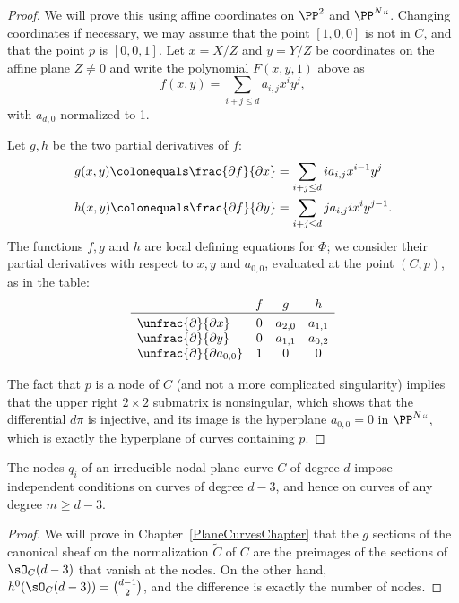 \begin{proof}
We will prove this using affine coordinates on $\PP^2$ and $\PP^N` `$.
Changing coordinates if necessary, we may assume that the point
$[1,0,0]$ is not in $C$, and that the point $p$ is $[0,0,1]$.
Let $x = X/Z$ and $y = Y/Z$ be coordinates on the affine plane $Z \neq 0$ and
write the polynomial $F(x,y,1)$ above as
$$
f(x,y) = \sum_{i+j \leq d} a_{i,j} x^iy^j
,
$$
with $a_{d,0}$ normalized to 1.

Let $g,h$ be the two partial derivatives of $f$:
\begin{align*}
 g(x,y) \colonequals  \frac{\partial f}{\partial x} &= \sum_{i+j \leq d} i a_{i,j} x^{i-1}y^j\\
h(x,y) \colonequals  \frac{\partial f}{\partial y} &= \sum_{i+j \leq d} j a_{i,j} ix^{i}y^{j-1}.
\end{align*}
The functions $f, g$ and $h$ are local defining equations for $\Phi$;
we consider their partial derivatives with respect to $x, y$ and
$a_{0,0}$, evaluated at the point $(C,p)$, as in
the table:
$$
     \begin{array}{lccc} %
            & f & g & h \\
      \hline
\vbox to 11pt{} %
\unfrac{\partial}{\partial x} & 0 & a_{2,0} & a_{1,1} \\
\unfrac{\partial}{\partial y} & 0 & a_{1,1} & a_{0,2} \\
\unfrac{\partial}{\partial a_{0,0}} & 1 & 0 & 0
    \end{array}
$$

The fact that $p$ is a node of $C$ (and not a more complicated singularity) implies that the upper right $2 \times 2$ submatrix is nonsingular, which shows that the differential $d\pi$ is injective, and its image is the hyperplane $a_{0,0} = 0$ in $\PP^N` `$, which is exactly the hyperplane of curves containing $p$.
\end{proof}

\begin{lemma}\label{adjoint independent}
The nodes $q_i$ of an irreducible nodal plane curve $C$ of degree $d$
%
%
impose independent conditions on curves of degree $d-3$, and hence on
curves of any degree $m \geq d-3$.
\end{lemma}

\begin{proof}
We will prove in Chapter~\ref{PlaneCurvesChapter} that the $g$ sections of the canonical sheaf on the normalization $\widetilde C$ of
$C$ are the preimages of the sections of $\sO_C(d-3)$ that vanish at the nodes. On the other hand,
$h^0(\sO_C(d-3)) = \tbinom{d-1}{2}$, and the difference is exactly the number of nodes.
\end{proof}

